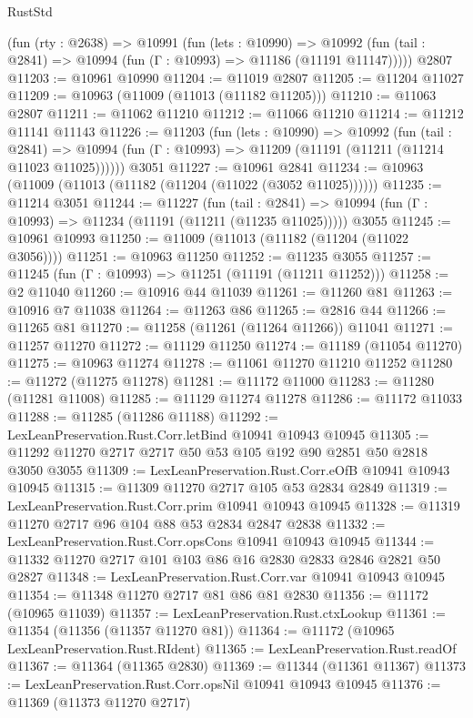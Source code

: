 \begin{lexlean}{RustStd}
\begin{coremodule}
    (fun (rty : @2638) =>
    @10991
      (fun (lets : @10990) =>
      @10992 (fun (tail : @2841) => @10994 (fun (Γ : @10993) => @11186 (@11191 @11147)))))
    @2807
@11203 := @10961 @10990
@11204 := @11019 @2807
@11205 := @11204 @11027
@11209 := @10963 (@11009 (@11013 (@11182 @11205)))
@11210 := @11063 @2807
@11211 := @11062 @11210
@11212 := @11066 @11210
@11214 := @11212 @11141 @11143
@11226 := @11203
    (fun (lets : @10990) =>
    @10992
      (fun (tail : @2841) =>
      @10994 (fun (Γ : @10993) => @11209 (@11191 (@11211 (@11214 @11023 @11025))))))
    @3051
@11227 := @10961 @2841
@11234 := @10963 (@11009 (@11013 (@11182 (@11204 (@11022 (@3052 @11025))))))
@11235 := @11214 @3051
@11244 := @11227
    (fun (tail : @2841) => @10994 (fun (Γ : @10993) => @11234 (@11191 (@11211 (@11235 @11025)))))
    @3055
@11245 := @10961 @10993
@11250 := @11009 (@11013 (@11182 (@11204 (@11022 @3056))))
@11251 := @10963 @11250
@11252 := @11235 @3055
@11257 := @11245 (fun (Γ : @10993) => @11251 (@11191 (@11211 @11252)))
@11258 := @2 @11040
@11260 := @10916 @44 @11039
@11261 := @11260 @81
@11263 := @10916 @7 @11038
@11264 := @11263 @86
@11265 := @2816 @44
@11266 := @11265 @81
@11270 := @11258 (@11261 (@11264 @11266)) @11041
@11271 := @11257 @11270
@11272 := @11129 @11250
@11274 := @11189 (@11054 @11270)
@11275 := @10963 @11274
@11278 := @11061 @11270 @11210 @11252
@11280 := @11272 (@11275 @11278)
@11281 := @11172 @11000
@11283 := @11280 (@11281 @11008)
@11285 := @11129 @11274 @11278
@11286 := @11172 @11033
@11288 := @11285 (@11286 @11188)
@11292 := LexLeanPreservation.Rust.Corr.letBind @10941 @10943 @10945
@11305 := @11292 @11270 @2717 @2717 @50 @53 @105 @192 @90 @2851 @50 @2818 @3050 @3055
@11309 := LexLeanPreservation.Rust.Corr.eOfB @10941 @10943 @10945
@11315 := @11309 @11270 @2717 @105 @53 @2834 @2849
@11319 := LexLeanPreservation.Rust.Corr.prim @10941 @10943 @10945
@11328 := @11319 @11270 @2717 @96 @104 @88 @53 @2834 @2847 @2838
@11332 := LexLeanPreservation.Rust.Corr.opsCons @10941 @10943 @10945
@11344 := @11332 @11270 @2717 @101 @103 @86 @16 @2830 @2833 @2846 @2821 @50 @2827
@11348 := LexLeanPreservation.Rust.Corr.var @10941 @10943 @10945
@11354 := @11348 @11270 @2717 @81 @86 @81 @2830
@11356 := @11172 (@10965 @11039)
@11357 := LexLeanPreservation.Rust.ctxLookup
@11361 := @11354 (@11356 (@11357 @11270 @81))
@11364 := @11172 (@10965 LexLeanPreservation.Rust.RIdent)
@11365 := LexLeanPreservation.Rust.readOf
@11367 := @11364 (@11365 @2830)
@11369 := @11344 (@11361 @11367)
@11373 := LexLeanPreservation.Rust.Corr.opsNil @10941 @10943 @10945
@11376 := @11369 (@11373 @11270 @2717)

\end{coremodule}
\end{lexlean}
